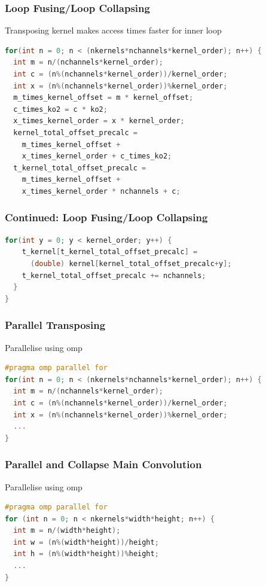 \documentclass{beamer}
\begin{document}
\begin{frame}[fragile]
\frametitle{Loop Fusing/Loop Collapsing}
Transposing kernel makes access times faster for inner loop
\begin{lstlisting}[language=C,keywordstyle=\color{blue}]
for(int n = 0; n < (nkernels*nchannels*kernel_order); n++) {
  int m = n/(nchannels*kernel_order);
  int c = (n%(nchannels*kernel_order))/kernel_order; 
  int x = (n%(nchannels*kernel_order))%kernel_order; 
  m_times_kernel_offset = m * kernel_offset;
  c_times_ko2 = c * ko2;
  x_times_kernel_order = x * kernel_order;
  kernel_total_offset_precalc = 
    m_times_kernel_offset + 
    x_times_kernel_order + c_times_ko2;
  t_kernel_total_offset_precalc = 
    m_times_kernel_offset + 
    x_times_kernel_order * nchannels + c;
\end{lstlisting}
\end{frame}

\begin{frame}[fragile]
\frametitle{Continued: Loop Fusing/Loop Collapsing }
\begin{lstlisting}[language=C,keywordstyle=\color{blue}]
  for(int y = 0; y < kernel_order; y++) {
    t_kernel[t_kernel_total_offset_precalc] = 
      (double) kernel[kernel_total_offset_precalc+y];
    t_kernel_total_offset_precalc += nchannels;
  }
}
\end{lstlisting}
\end{frame}

\begin{frame}[fragile]
\frametitle{Parallel Transposing}
Parallelise using omp
\begin{lstlisting}[language=C,keywordstyle=\color{blue}]
#pragma omp parallel for
for(int n = 0; n < (nkernels*nchannels*kernel_order); n++) {
  int m = n/(nchannels*kernel_order);
  int c = (n%(nchannels*kernel_order))/kernel_order; 
  int x = (n%(nchannels*kernel_order))%kernel_order; 
  ...
}
\end{lstlisting}
\end{frame}

\begin{frame}[fragile]
\frametitle{Parallel and Collapse Main Convolution}
Parallelise using omp
\begin{lstlisting}[language=C,keywordstyle=\color{blue}]
#pragma omp parallel for
for (int n = 0; n < nkernels*width*height; n++) {
  int m = n/(width*height);
  int w = (n%(width*height))/height;
  int h = (n%(width*height))%height;
  ...
}
\end{lstlisting}
\end{frame}
\end{document}
